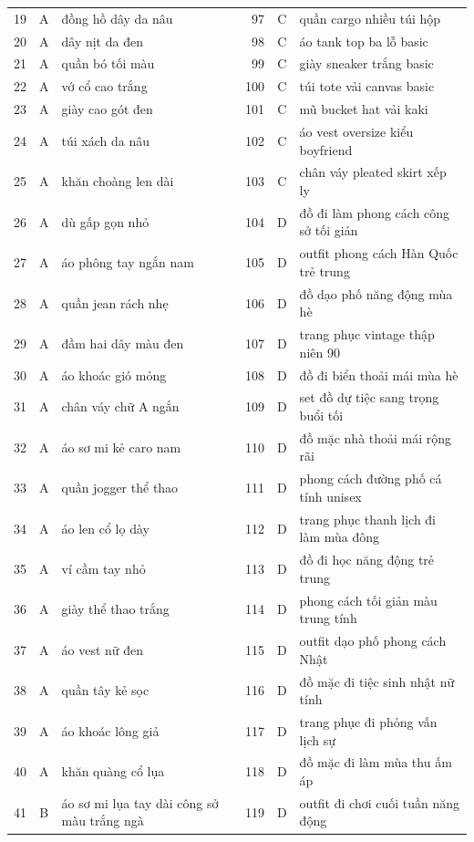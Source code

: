 \begin{longtable}{@{}r c p{5.7cm} r c p{5.7cm}@{}}
19 & A & đồng hồ dây da nâu & 97 & C & quần cargo nhiều túi hộp \\
20 & A & dây nịt da đen & 98 & C & áo tank top ba lỗ basic \\
21 & A & quần bó tối màu & 99 & C & giày sneaker trắng basic \\
22 & A & vớ cổ cao trắng & 100 & C & túi tote vải canvas basic \\
23 & A & giày cao gót đen & 101 & C & mũ bucket hat vải kaki \\
24 & A & túi xách da nâu & 102 & C & áo vest oversize kiểu boyfriend \\
25 & A & khăn choàng len dài & 103 & C & chân váy pleated skirt xếp ly \\
26 & A & dù gấp gọn nhỏ & 104 & D & đồ đi làm phong cách công sở tối giản \\
27 & A & áo phông tay ngắn nam & 105 & D & outfit phong cách Hàn Quốc trẻ trung \\
28 & A & quần jean rách nhẹ & 106 & D & đồ dạo phố năng động mùa hè \\
29 & A & đầm hai dây màu đen & 107 & D & trang phục vintage thập niên 90 \\
30 & A & áo khoác gió mỏng & 108 & D & đồ đi biển thoải mái mùa hè \\
31 & A & chân váy chữ A ngắn & 109 & D & set đồ dự tiệc sang trọng buổi tối \\
32 & A & áo sơ mi kẻ caro nam & 110 & D & đồ mặc nhà thoải mái rộng rãi \\
33 & A & quần jogger thể thao & 111 & D & phong cách đường phố cá tính unisex \\
34 & A & áo len cổ lọ dày & 112 & D & trang phục thanh lịch đi làm mùa đông \\
35 & A & ví cầm tay nhỏ & 113 & D & đồ đi học năng động trẻ trung \\
36 & A & giày thể thao trắng & 114 & D & phong cách tối giản màu trung tính \\
37 & A & áo vest nữ đen & 115 & D & outfit dạo phố phong cách Nhật \\
38 & A & quần tây kẻ sọc & 116 & D & đồ mặc đi tiệc sinh nhật nữ tính \\
39 & A & áo khoác lông giả & 117 & D & trang phục đi phỏng vấn lịch sự \\
40 & A & khăn quàng cổ lụa & 118 & D & đồ mặc đi làm mùa thu ấm áp \\
41 & B & áo sơ mi lụa tay dài công sở màu trắng ngà & 119 & D & outfit đi chơi cuối tuần năng động \\

\end{longtable}

